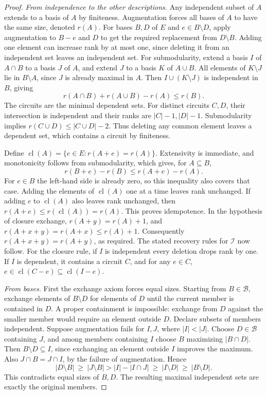 \documentclass[11pt,oneside,openany]{book}
\theoremstyle{plain}
\theoremstyle{definition}
\theoremstyle{remark}
\begin{document}
\begin{proof}
\emph{From independence to the other descriptions.}
Any independent subset of \(A\) extends to a basis of \(A\) by
finiteness. Augmentation forces all bases of \(A\) to have the
same size, denoted \(r(A)\). For bases \(B,D\) of \(E\) and
\(e\in B\setminus D\), apply augmentation to \(B-e\) and \(D\)
to get the required replacement from \(D\setminus B\).
Adding one element can increase rank by at most one, since
deleting it from an independent set leaves an independent set.
For submodularity, extend a basis \(I\) of \(A\cap B\) to a
basis \(J\) of \(A\), and extend \(J\) to a basis \(K\) of
\(A\cup B\). All elements of \(K\setminus J\) lie in \(B\setminus
A\), since \(J\) is already maximal in \(A\). Then
\(I\cup(K\setminus J)\) is independent in \(B\), giving
\[
 r(A\cap B)+r(A\cup B)-r(A)\le r(B).
\]
The circuits are the minimal dependent sets. For distinct
circuits \(C,D\), their intersection is independent and their
ranks are \(|C|-1,|D|-1\). Submodularity implies
\(r(C\cup D)\le |C\cup D|-2\). Thus deleting any common element
leaves a dependent set, which contains a circuit by finiteness.

Define \(\operatorname{cl}(A)=\{e\in E:r(A+e)=r(A)\}\).
Extensivity is immediate, and monotonicity follows from
submodularity, which gives, for \(A\subseteq B\),
\[
 r(B+e)-r(B)\le r(A+e)-r(A).
\]
For \(e\in B\) the left-hand side is already zero, so this
inequality also covers that case. Adding the elements of
\(\operatorname{cl}(A)\) one at a time leaves rank unchanged.
If adding \(e\) to \(\operatorname{cl}(A)\) also leaves rank
unchanged, then \(r(A+e)\le r(\operatorname{cl}(A))=r(A)\).
This proves idempotence. In the hypothesis of closure exchange,
\(r(A+y)=r(A)+1\), and \(r(A+x+y)=r(A+x)\le r(A)+1\).
Consequently \(r(A+x+y)=r(A+y)\), as required.
The stated recovery rules for \(\mathcal I\) now follow.
For the closure rule, if \(I\) is independent every deletion
drops rank by one. If \(I\) is dependent, it contains a
circuit \(C\), and for any \(e\in C\),
\(e\in\operatorname{cl}(C-e)\subseteq\operatorname{cl}(I-e)\).

\smallskip
\emph{From bases.}
First the exchange axiom forces equal sizes. Starting from
\(B\in\mathcal B\), exchange elements of \(B\setminus D\) for
elements of \(D\) until the current member is contained in \(D\).
A proper containment is impossible: exchange from \(D\) against
the smaller member would require an element outside \(D\).
Declare subsets of members independent. Suppose augmentation
fails for \(I,J\), where \(|I|<|J|\). Choose \(D\in\mathcal B\)
containing \(J\), and among members containing \(I\) choose
\(B\) maximizing \(|B\cap D|\). Then \(B\setminus D\subseteq I\),
since exchanging an element outside \(I\) improves the maximum.
Also \(J\cap B=J\cap I\), by the failure of augmentation. Hence
\[
 |D\setminus B|\ \ge\ |J\setminus B|
 > |I|-|I\cap J|\ \ge\ |I\setminus D|
 \ \ge\ |B\setminus D|.
\]
This contradicts equal sizes of \(B,D\). The resulting maximal
independent sets are exactly the original members.


\end{proof}
\end{document}
